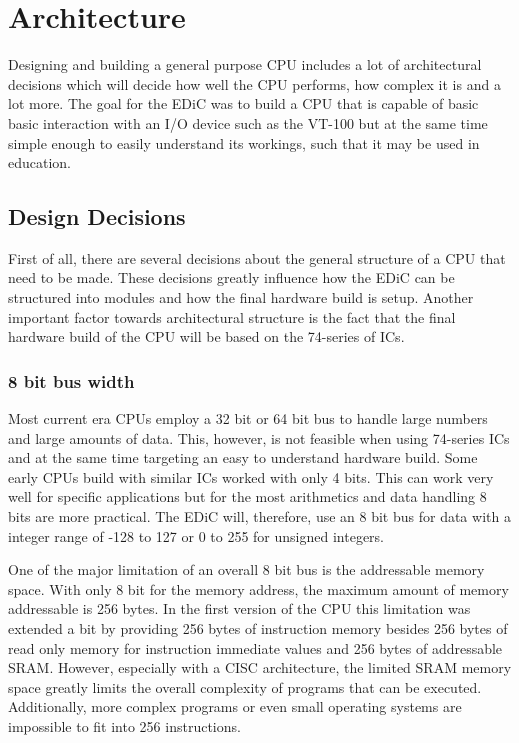 \chapter{Architecture}\label{cha:architecture}
Designing and building a general purpose \gls{CPU} includes a lot of architectural decisions which will decide how well the \gls{CPU} performs, how complex it is and a lot more.
The goal for the \gls{EDiC} was to build a \gls{CPU} that is capable of basic basic interaction with an I/O device such as the VT-100 but at the same time simple enough to easily understand its workings, such that it may be used in education.

\section{Design Decisions}
First of all, there are several decisions about the general structure of a \gls{CPU} that need to be made.
These decisions greatly influence how the \gls{EDiC} can be structured into modules and how the final hardware build is setup.
Another important factor towards architectural structure is the fact that the final hardware build of the \gls{CPU} will be based on the 74-series of \glspl{IC}.

\subsection{8 bit bus width}
Most current era \glspl{CPU} employ a 32 bit or 64 bit bus to handle large numbers and large amounts of data.
This, however, is not feasible when using 74-series \glspl{IC} and at the same time targeting an easy to understand hardware build.
Some early \glspl{CPU} build with similar \glspl{IC} worked with only 4 bits.
This can work very well for specific applications but for the most arithmetics and data handling 8 bits are more practical.
The \gls{EDiC} will, therefore, use an 8 bit bus for data with a integer range of -128 to 127 or 0 to 255 for unsigned integers.

One of the major limitation of an overall 8 bit bus is the addressable memory space.
With only 8 bit for the memory address, the maximum amount of memory addressable is 256 bytes.
In the first version of the \gls{CPU} this limitation was extended a bit by providing 256 bytes of instruction memory besides 256 bytes of read only memory for instruction immediate values and 256 bytes of addressable \gls{SRAM}.
However, especially with a \gls{CISC} architecture, the limited \gls{SRAM} memory space greatly limits the overall complexity of programs that can be executed.
Additionally, more complex programs or even small operating systems are impossible to fit into 256 instructions.

